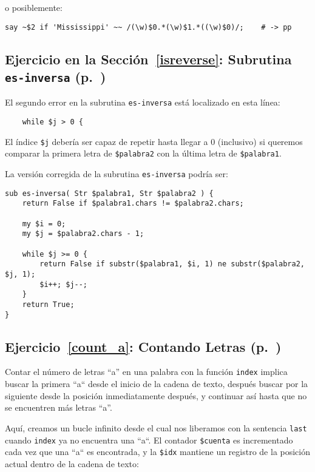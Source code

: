 o posiblemente:
\begin{verbatim}
say ~$2 if 'Mississippi' ~~ /(\w)$0.*(\w)$1.*((\w)$0)/;    # -> pp
\end{verbatim}


\subsection{Ejercicio en la Sección~\ref{isreverse}: Subrutina {\tt es-inversa} (p.~\pageref{isreverse})}
\label{sol_isreverse}

El segundo error en la subrutina {\tt es-inversa} está localizado
en esta línea:

\begin{verbatim}
    while $j > 0 {
\end{verbatim}
%

El índice {\tt \$j} debería ser capaz de repetir hasta llegar
a 0 (inclusivo) si queremos comparar la primera letra de
{\tt \$palabra2} con la última letra de {\tt \$palabra1}.

La versión corregida de la subrutina {\tt es-inversa} 
podría ser:

\begin{verbatim}
sub es-inversa( Str $palabra1, Str $palabra2 ) {
    return False if $palabra1.chars != $palabra2.chars;
    
    my $i = 0;
    my $j = $palabra2.chars - 1;

    while $j >= 0 {
        return False if substr($palabra1, $i, 1) ne substr($palabra2, $j, 1);
        $i++; $j--;
    }
    return True;
}
\end{verbatim}
%

\subsection{Ejercicio~\ref{count_a}: Contando Letras (p.~\pageref{count_a})}
\label{sol_count_a}

Contar el número de letras ``a'' en una palabra con la función 
{\tt index} implica buscar la primera ``a`` desde el inicio de la
cadena de texto, después buscar por la siguiente desde la posición
inmediatamente después, y continuar así hasta que no se encuentren
más letras ``a''.


Aquí, creamos un bucle infinito desde el cual nos liberamos con
la sentencia {\tt last} cuando {\tt index} ya no encuentra una ``a``.
El contador {\tt \$cuenta} es incrementado cada vez que una ``a``
es encontrada, y la {\tt \$idx} mantiene un registro de la
posición actual dentro de la cadena de texto:

